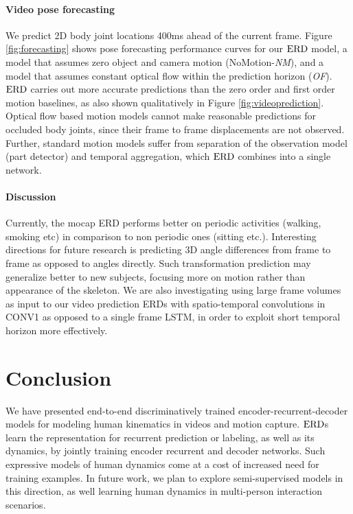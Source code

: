 \documentclass[10pt,twocolumn,letterpaper]{article}
\begin{document}
\paragraph{Video pose forecasting}
We predict 2D  body joint locations  400ms ahead of the current frame. 
Figure \ref{fig:forecasting} shows pose forecasting performance curves for our $\text{ERD}$ model, a model that assumes zero object and camera motion  (NoMotion-\textit{NM}), and a model that assumes constant optical flow within the prediction horizon (\textit{OF}).  
$\text{ERD}$ carries out more accurate predictions than the zero order and first order motion baselines, as also shown qualitatively in Figure \ref{fig:videoprediction}.  
Optical flow based motion models cannot make reasonable predictions for occluded body joints, since their frame to frame displacements are not observed.  
Further, standard motion models suffer from separation of the observation model (part detector) and temporal aggregation, which $\text{ERD}$ combines into a single network.  



\paragraph{Discussion}
Currently, the mocap ERD performs  better on periodic activities (walking, smoking etc) in comparison to non periodic ones (sitting etc.).  Interesting directions for future research is predicting 3D angle differences from frame to frame as opposed to angles directly. Such transformation prediction may generalize better to new subjects, focusing more on  motion rather than  appearance of the skeleton. We are also investigating using large frame volumes as input to our video prediction ERDs with spatio-temporal convolutions in CONV1 as opposed to a single frame LSTM, in order to exploit short temporal horizon more effectively. 


     \section{Conclusion}
We have presented end-to-end  discriminatively trained encoder-recurrent-decoder models for modeling human kinematics in videos and motion capture. $\text{ERD}$s   learn the representation for recurrent prediction or labeling, as well as its dynamics, by jointly training encoder recurrent and decoder networks. 
Such expressive models of human dynamics come at a cost of increased need for training examples. In future work, we plan to explore semi-supervised models in this direction, as well learning human dynamics   in multi-person interaction scenarios.   
\end{document}
